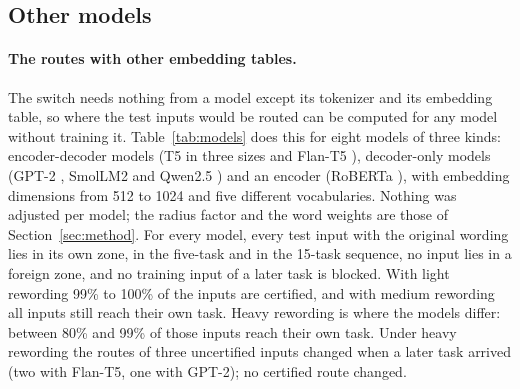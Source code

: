 \subsection{Other models}
\label{app:models}

\paragraph{The routes with other embedding tables.} The switch needs nothing from a model except its
tokenizer and its embedding table, so where the test inputs would be routed can be computed for any
model without training it. Table~\ref{tab:models} does this for eight models of three kinds:
encoder-decoder models (T5 in three sizes \citep{raffel2020t5} and Flan-T5
\citep{chung2024flant5}), decoder-only models (GPT-2 \citep{radford2019gpt2}, SmolLM2
\citep{allal2025smollm2} and Qwen2.5 \citep{yang2024qwen25}) and an encoder (RoBERTa
\citep{liu2019roberta}), with embedding dimensions from 512 to 1024 and five different
vocabularies. Nothing was adjusted per model; the radius factor and the word weights are those of
Section~\ref{sec:method}. For every model, every test input with the original wording lies in its
own zone, in the five-task and in the 15-task sequence, no input lies in a foreign zone, and no
training input of a later task is blocked. With light rewording 99\% to 100\% of the inputs are
certified, and with medium rewording all inputs still reach their own task. Heavy rewording is
where the models differ: between 80\% and 99\% of those inputs reach their own task. Under heavy rewording the routes of three uncertified inputs changed when a later task arrived (two with Flan-T5, one with GPT-2); no certified route changed.

\begin{table}[t]
  \caption{Routes computed with the embedding tables of eight models (CPU, no training). Entries
  with four numbers are for the original / light / medium / heavy wording. ``Wrong zone'': inputs
  inside the zone of another task, over both sequences and all wordings. ``Changed'': inputs
  whose route changed after their task had been added. With the original wording every input of
  the 15-task sequence is certified for every model.}
  \label{tab:models}
  \centering
  \footnotesize
  \setlength{\tabcolsep}{3pt}
  
\end{table}

